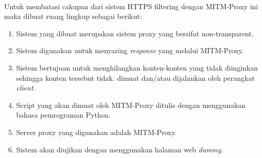 \documentclass[../PROPOSAL_PRA_SKRIPSI_ALDZIKRI_DWIJAYANTO_PRATHAMA.tex]{subfiles}
\begin{document}
  \paragraph*{} Untuk membatasi cakupan dari sistem HTTPS filtering dengan
    MITM-Proxy ini maka dibuat ruang lingkup sebagai berikut:
    \begin{enumerate}
      \item Sistem yang dibuat merupakan sistem proxy yang
      bersifat non-transparent.
      \item Sistem digunakan untuk menyaring \textit{response}
      yang melalui MITM-Proxy.
      \item Sistem bertujuan untuk menghilangkan konten-konten
      yang tidak diinginkan sehingga konten tersebut tidak.
      dimuat dan/atau dijalankan oleh perangkat \textit{client}.
      \item Script yang akan dimuat oleh MITM-Proxy ditulis
      dengan menggunakan bahasa pemrograman Python.
      \item Server proxy yang digunakan adalah MITM-Proxy.
      \item Sistem akan diujikan dengan menggunakan halaman
      web \textit{dummy}.
    \end{enumerate}
\end{document}
